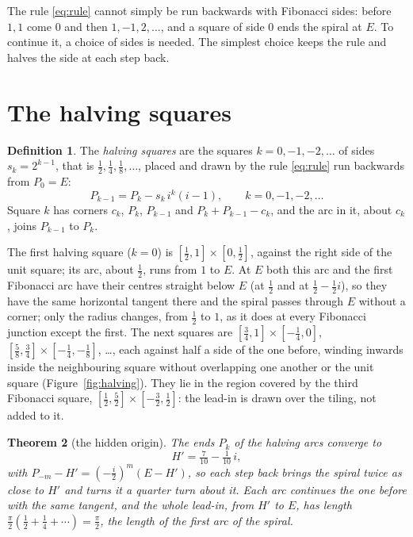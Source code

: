 \documentclass[11pt,a4paper]{article}
\theoremstyle{plain}
\newtheorem{theorem}{Theorem}
\theoremstyle{definition}
\newtheorem{definition}[theorem]{Definition}
\theoremstyle{remark}
\begin{document}
The rule \eqref{eq:rule} cannot simply be run backwards with Fibonacci sides: before $1,1$ come $0$ and then $1,-1,2,\dots$, and a square of side $0$ ends the spiral at $E$. To continue it, a choice of sides is needed. The simplest choice keeps the rule and halves the side at each step back.

\section{The halving squares}

\begin{definition}
The \emph{halving squares} are the squares $k=0,-1,-2,\dots$ of sides $s_k=2^{k-1}$, that is $\tfrac12,\tfrac14,\tfrac18,\dots$, placed and drawn by the rule \eqref{eq:rule} run backwards from $P_0=E$:
\[
  P_{k-1}=P_k-s_k\,i^{k}(i-1),\qquad k=0,-1,-2,\dots
\]
Square $k$ has corners $c_k$, $P_k$, $P_{k-1}$ and $P_k+P_{k-1}-c_k$, and the arc in it, about $c_k$, joins $P_{k-1}$ to $P_k$.
\end{definition}

The first halving square ($k=0$) is $[\tfrac12,1]\times[0,\tfrac12]$, against the right side of the unit square; its arc, about $\tfrac12$, runs from $1$ to $E$. At $E$ both this arc and the first Fibonacci arc have their centres straight below $E$ (at $\tfrac12$ and at $\tfrac12-\tfrac12 i$), so they have the same horizontal tangent there and the spiral passes through $E$ without a corner; only the radius changes, from $\tfrac12$ to $1$, as it does at every Fibonacci junction except the first. The next squares are $[\tfrac34,1]\times[-\tfrac14,0]$, $[\tfrac58,\tfrac34]\times[-\tfrac14,-\tfrac18]$, \dots, each against half a side of the one before, winding inwards inside the neighbouring square without overlapping one another or the unit square (Figure~\ref{fig:halving}). They lie in the region covered by the third Fibonacci square, $[\tfrac12,\tfrac52]\times[-\tfrac32,\tfrac12]$: the lead-in is drawn over the tiling, not added to it.

\begin{theorem}[the hidden origin]\label{thm:limit}
The ends $P_k$ of the halving arcs converge to
\[
  H'=\tfrac7{10}-\tfrac1{10}\,i ,
\]
with $P_{-m}-H'=(-\tfrac{i}{2})^{m}(E-H')$, so each step back brings the spiral twice as close to $H'$ and turns it a quarter turn about it. Each arc continues the one before with the same tangent, and the whole lead-in, from $H'$ to $E$, has length $\tfrac\pi2(\tfrac12+\tfrac14+\cdots)=\tfrac\pi2$, the length of the first arc of the spiral.
\end{theorem}
\end{document}
